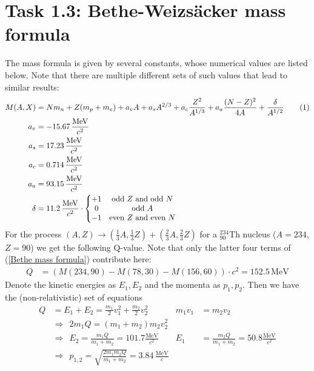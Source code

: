 \documentclass[a4paper,12pt]{article}
\newcommand\numberthis{\addtocounter{equation}{1}\tag{\theequation}}
\newcommand{\tecxt}{}
\begin{document}
\section*{Task 1.3: Bethe-Weizsäcker mass formula}
The mass formula is given by several constants, whose numerical values are listed below. Note that there are multiple different sets of such values that lead to similar results:
\begin{align*}
M(A,X)&=Nm_n+Z(m_p+m_e)+a_vA+a_sA^{2/3}+a_c\frac{Z^2}{A^{1/3}}+a_a\frac{(N-Z)^2}{4A}+\frac{\delta }{A^{1/2}}\numberthis\label{Bethe mass formula}\\
a_v&=-15.67\,\frac{\tecxt\text{MeV}}{c^2}\\
a_s&=17.23\,\frac{\tecxt\text{MeV}}{c^2}\\
a_c&=0.714\,\frac{\tecxt\text{MeV}}{c^2}\\
a_a&=93.15\,\frac{\tecxt\text{MeV}}{c^2}\\
\delta &=11.2\,\frac{\tecxt\text{MeV}}{c^2}\cdot\left\{\begin{matrix}
+1 & \tecxt\text{odd }Z\ \tecxt\text{and odd }N \\ 0 & \tecxt\text{odd }A  \\ -1 & \tecxt\text{even }Z\ \tecxt\text{and even }N
\end{matrix}\right.\\
\end{align*}
For the process $(A,Z)\rightarrow (\frac{1}{3}A,\frac{1}{3}Z)+(\frac{2}{3}A,\frac{2}{3}Z)$ for a ${}_{90}^{234}$Th nucleus ($A=234$, $Z=90$) we get the following Q-value. Note that only the latter four terms of (\ref{Bethe mass formula}) contribute here:
\begin{align*}
Q&=\left(M(234,90)-M(78,30)-M(156,60)\right)\cdot c^2=152.5\,\tecxt\text{MeV}
\end{align*}
Denote the kinetic energies as $E_1,E_2$ and the momenta as $p_1,p_2$. Then we have the (non-relativistic) set of equations
\begin{align*}
Q&=E_1+E_2=\frac{m_1}{2}v_1^2+\frac{m_2}{2}v_2^2&m_1v_1&=m_2v_2\\
&\Rightarrow\ \ 2m_1Q=(m_1+m_2)m_2v_2^2\\
&\Rightarrow\ \ E_2=\frac{m_1Q}{m_1+m_2}=101.7\frac{\tecxt\text{MeV}}{c^2}&E_1&=\frac{m_2Q}{m_1+m_2}=50.8\frac{\tecxt\text{MeV}}{c^2}\\
&\Rightarrow\ \ p_{1,2}=\sqrt{\frac{2m_1m_2Q}{m_1+m_2}}=3.84\,\frac{\tecxt\text{MeV}}{c}
\end{align*}
\end{document}
